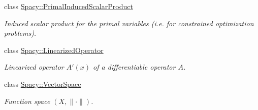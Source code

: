 \begin{DoxyCompactItemize}
class \hyperlink{classSpacy_1_1PrimalInducedScalarProduct}{Spacy\+::\+Primal\+Induced\+Scalar\+Product}
\begin{DoxyCompactList}\small\item\em Induced scalar product for the primal variables (i.\+e. for constrained optimization problems). \end{DoxyCompactList}\item 
class \hyperlink{classSpacy_1_1LinearizedOperator}{Spacy\+::\+Linearized\+Operator}
\begin{DoxyCompactList}\small\item\em Linearized operator $A'(x)$ of a differentiable operator $A$. \end{DoxyCompactList}\item 
class \hyperlink{classSpacy_1_1VectorSpace}{Spacy\+::\+Vector\+Space}
\begin{DoxyCompactList}\small\item\em Function space $(X,\|\cdot\|)$. \end{DoxyCompactList}\end{DoxyCompactItemize}
